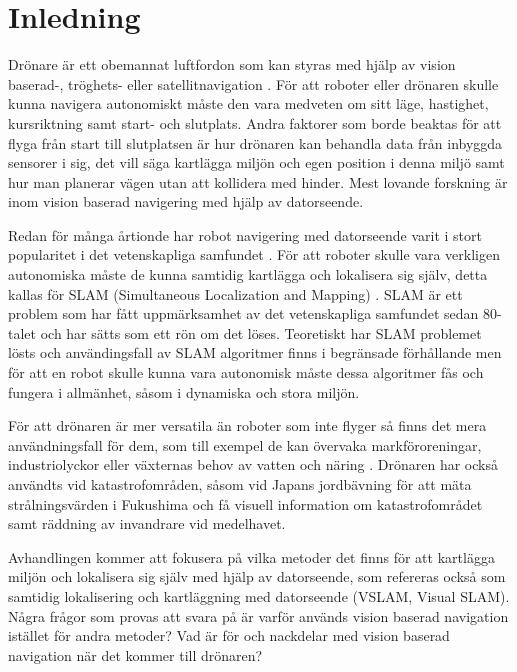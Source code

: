 
\chapter{Inledning}

Drönare är ett obemannat luftfordon som kan styras med hjälp av vision baserad-, tröghets- eller satellitnavigation \citep{geospatial}. För att roboter eller drönaren skulle kunna navigera autonomiskt måste den vara medveten om sitt läge, hastighet, kursriktning samt start- och slutplats. Andra faktorer som borde beaktas för att flyga från start till slutplatsen är hur drönaren kan behandla data från inbyggda sensorer i sig, det vill säga kartlägga miljön och egen position i denna miljö samt hur man planerar vägen utan att kollidera med hinder. Mest lovande forskning är inom vision baserad navigering med hjälp av datorseende.

Redan för många årtionde har robot navigering med datorseende varit i stort popularitet i det vetenskapliga samfundet \citep{982903}. För att roboter skulle vara verkligen autonomiska måste de kunna samtidig kartlägga och lokalisera sig själv, detta kallas för SLAM (Simultaneous Localization and Mapping) \citep{realslamproblem}. SLAM är ett problem som har fått uppmärksamhet av det vetenskapliga samfundet sedan 80-talet och har sätts som ett rön om det löses. Teoretiskt har SLAM problemet lösts och användingsfall av SLAM algoritmer finns i begränsade förhållande men för att en robot skulle kunna vara autonomisk måste dessa algoritmer fås och fungera i allmänhet, såsom i dynamiska och stora miljön.

För att drönaren är mer versatila än roboter som inte flyger så finns det mera användningsfall för dem, som till exempel de kan övervaka markföroreningar, industriolyckor eller växternas behov av vatten och näring \citep{crowdsurveillance}. Drönaren har också användts vid katastrofområden, såsom vid Japans jordbävning för att mäta strålningsvärden i Fukushima och få visuell information om katastrofområdet samt räddning av invandrare vid medelhavet.

Avhandlingen kommer att fokusera på vilka metoder det finns för att kartlägga miljön och lokalisera sig själv med hjälp av datorseende, som refereras också som samtidig lokalisering och kartläggning med datorseende (VSLAM, Visual SLAM). Några frågor som provas att svara på är varför används vision baserad navigation istället för andra metoder? Vad är för och nackdelar med vision baserad navigation när det kommer till drönaren?

